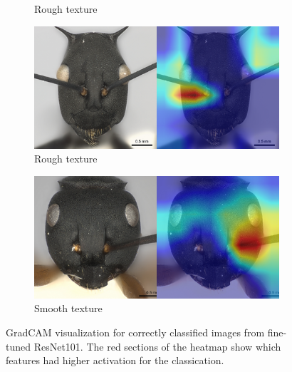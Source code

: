 \documentclass{aci}
\numberwithin{equation}{section}
\begin{document}
\begin{figure}
\begin{subfigure}{\subwidth}
        \caption*{Rough texture}
        \label{fig:correct_nonideal_1554}
    \end{subfigure}
    \begin{subfigure}{\subwidth}
        \includegraphics[width=1\linewidth]{thesis_assets/gradcam/correct_nonideal/1694.png}
        \caption*{Rough texture}
        \label{fig:correct_nonideal_1694}
    \end{subfigure}
    \begin{subfigure}{\subwidth}
        \includegraphics[width=1\linewidth]{thesis_assets/gradcam/correct_nonideal/388.png}
        \caption*{Smooth texture}
        \label{fig:correct_nonideal_388}
    \end{subfigure}
    \caption{GradCAM visualization for correctly classified images from
        fine-tuned ResNet101. The red sections of the heatmap show which features
        had higher activation for the classication.}
    \label{fig:correct_images}
\end{figure}
\end{document}
